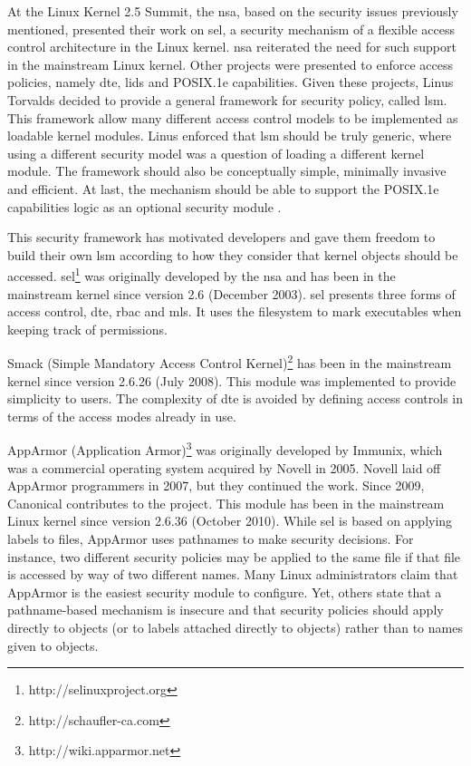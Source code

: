 At the Linux Kernel 2.5 Summit, the \gls{nsa}, based on the security issues previously mentioned, presented their work on \gls{sel}, a security mechanism of a flexible access control architecture in the Linux kernel. \gls{nsa} reiterated the need for such support in the mainstream Linux kernel. Other projects were presented to enforce access policies, namely \gls{dte}, \gls{lids} and POSIX.1e capabilities. Given these projects, Linus Torvalds decided to provide a general framework for security policy, called \gls{lsm}. This framework allow many different access control models to be implemented as loadable kernel modules. Linus enforced that \gls{lsm} should be truly generic, where using a different security model was a question of loading a different kernel module. The framework should also be conceptually simple, minimally invasive and efficient. At last, the mechanism should be able to support the POSIX.1e capabilities logic as an optional security module \cite{WCSMK02}.

This security framework has motivated developers and gave them freedom to build their own \gls{lsm} according to how they consider that kernel objects should be accessed. \gls{sel}\footnote{http://selinuxproject.org} was originally developed by the \gls{nsa} and has been in the mainstream kernel since version 2.6 (December 2003). \gls{sel} presents three forms of access control, \gls{dte}, \gls{rbac} and \gls{mls}. It uses the filesystem to mark executables when keeping track of permissions.

Smack (Simple Mandatory Access Control Kernel)\footnote{http://schaufler-ca.com} has been in the mainstream kernel since version 2.6.26 (July 2008). This module was implemented to provide simplicity to users. The complexity of \gls{dte} is avoided by defining access controls in terms of the access modes already in use.

AppArmor (Application Armor)\footnote{http://wiki.apparmor.net} was originally developed by Immunix, which was a commercial operating system acquired by Novell in 2005. Novell laid off AppArmor programmers in 2007, but they continued the work. Since 2009, Canonical contributes to the project. This module has been in the mainstream Linux kernel since version 2.6.36 (October 2010). While \gls{sel} is based on applying labels to files, AppArmor uses pathnames to make security decisions. For instance, two different security policies may be applied  to the same file if that file is accessed by way of two different names. Many Linux administrators claim that AppArmor is the easiest security module to configure. Yet, others state that a pathname-based mechanism is insecure and that security policies should apply directly to objects (or to labels attached directly to objects) rather than to names given to objects.

